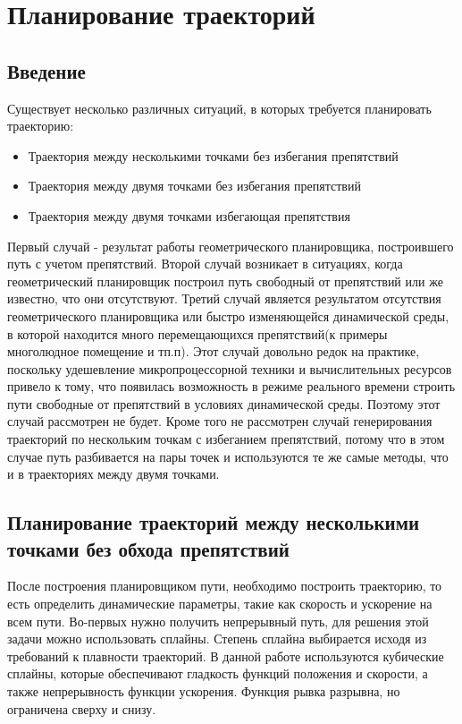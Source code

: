 \chapter{Планирование траекторий} \label{chapt2}

\section{Введение} \label{sect2_1}
Существует несколько различных ситуаций, в которых требуется планировать траекторию:
\begin{itemize}
	\item Траектория между несколькими точками без избегания препятствий
	\item Траектория между двумя точками без избегания препятствий
	\item Траектория между двумя точками избегающая препятствия
\end{itemize}

Первый случай - результат работы геометрического планировщика, построившего путь с учетом препятствий.
Второй случай возникает в ситуациях, когда геометрический планировщик построил путь свободный от препятствий или же известно, что они отсутствуют.
Третий случай является результатом отсутствия геометрического планировщика или быстро изменяющейся динамической среды, в которой находится много перемещающихся препятствий(к примеры многолюдное помещение и тп.п). Этот случай довольно редок на практике, поскольку удешевление микропроцессорной техники и вычислительных ресурсов привело к тому, что появилась возможность в режиме реального времени строить пути свободные от препятствий в условиях динамической среды. Поэтому этот случай рассмотрен не будет. 
Кроме того не рассмотрен случай генерирования траекторий по нескольким точкам с избеганием препятствий, потому что в этом случае путь разбивается на пары точек и используются те же самые методы, что и в траекториях между двумя точками.

\section{Планирование траекторий между несколькими точками без обхода препятствий} \label{sect2_2}
После построения планировщиком пути, необходимо построить траекторию, то есть определить динамические параметры, такие как скорость и ускорение на всем пути. Во-первых нужно получить непрерывный путь, для решения этой задачи можно использовать сплайны. Степень сплайна выбирается исходя из требований к плавности траекторий. В данной работе используются кубические сплайны, которые обеспечивают гладкость функций положения и скорости, а также непрерывность функции ускорения. Функция рывка разрывна, но ограничена сверху и снизу.

